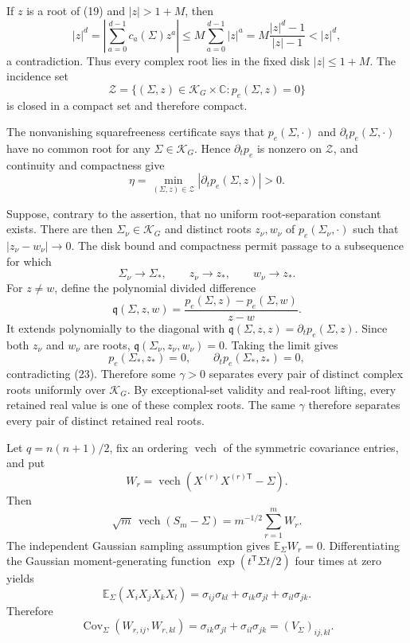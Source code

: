 If \(z\) is a root of (19) and \(|z|>1+M\), then
\[
 |z|^d
 =\left|\sum_{a=0}^{d-1}c_a(\Sigma)z^a\right|
 \leq M\sum_{a=0}^{d-1}|z|^a
 =M\frac{|z|^d-1}{|z|-1}
 <|z|^d,                                                        \tag{21}
\]
a contradiction.  Thus every complex root lies in the fixed disk \(|z|\leq1+M\).  The incidence set
\[
 \mathscr Z
 =\{(\Sigma,z)\in\mathcal K_G\times\mathbb C:
       p_e(\Sigma,z)=0\}                                      \tag{22}
\]
is closed in a compact set and therefore compact.

The nonvanishing squarefreeness certificate says that \(p_e(\Sigma,\cdot)\) and \(\partial_t p_e(\Sigma,\cdot)\) have no common root for any \(\Sigma\in\mathcal K_G\).  Hence \(\partial_t p_e\) is nonzero on \(\mathscr Z\), and continuity and compactness give
\[
 \eta
 =\min_{(\Sigma,z)\in\mathscr Z}
       |\partial_t p_e(\Sigma,z)|>0.                            \tag{23}
\]

Suppose, contrary to the assertion, that no uniform root-separation constant exists.  There are then \(\Sigma_\nu\in\mathcal K_G\) and distinct roots \(z_\nu,w_\nu\) of \(p_e(\Sigma_\nu,\cdot)\) such that \(|z_\nu-w_\nu|\to0\).  The disk bound and compactness permit passage to a subsequence for which
\[
 \Sigma_\nu\to\Sigma_*,\qquad z_\nu\to z_*,\qquad w_\nu\to z_*.
\]
For \(z\ne w\), define the polynomial divided difference
\[
 \mathfrak q(\Sigma,z,w)
 =\frac{p_e(\Sigma,z)-p_e(\Sigma,w)}{z-w}.
\]
It extends polynomially to the diagonal with
\(\mathfrak q(\Sigma,z,z)=\partial_t p_e(\Sigma,z)\).  Since both \(z_\nu\) and \(w_\nu\) are roots, \(\mathfrak q(\Sigma_\nu,z_\nu,w_\nu)=0\).  Taking the limit gives
\[
 p_e(\Sigma_*,z_*)=0,
 \qquad
 \partial_t p_e(\Sigma_*,z_*)=0,                               \tag{24}
\]
contradicting (23).  Therefore some \(\gamma>0\) separates every pair of distinct complex roots uniformly over \(\mathcal K_G\).  By exceptional-set validity and real-root lifting, every retained real value is one of these complex roots.  The same \(\gamma\) therefore separates every pair of distinct retained real roots.

Let \(q=n(n+1)/2\), fix an ordering \(\operatorname{vech}\) of the symmetric covariance entries, and put
\[
 W_r
 =\operatorname{vech}\!\left(X^{(r)}X^{(r)\mathsf T}-\Sigma\right).
\]
Then
\[
 \sqrt m\,\operatorname{vech}(S_m-\Sigma)
 =m^{-1/2}\sum_{r=1}^m W_r.                                    \tag{25}
\]
The independent Gaussian sampling assumption gives \(\mathbb E_\Sigma W_r=0\).  Differentiating the Gaussian moment-generating function \(\exp(t^{\mathsf T}\Sigma t/2)\) four times at zero yields
\[
 \mathbb E_\Sigma(X_iX_jX_kX_l)
 =\sigma_{ij}\sigma_{kl}
  +\sigma_{ik}\sigma_{jl}
  +\sigma_{il}\sigma_{jk}.
\]
Therefore
\[
 \operatorname{Cov}_\Sigma(W_{r,ij},W_{r,kl})
 =\sigma_{ik}\sigma_{jl}+\sigma_{il}\sigma_{jk}
 =(V_\Sigma)_{ij,kl}.                                          \tag{26}
\]

